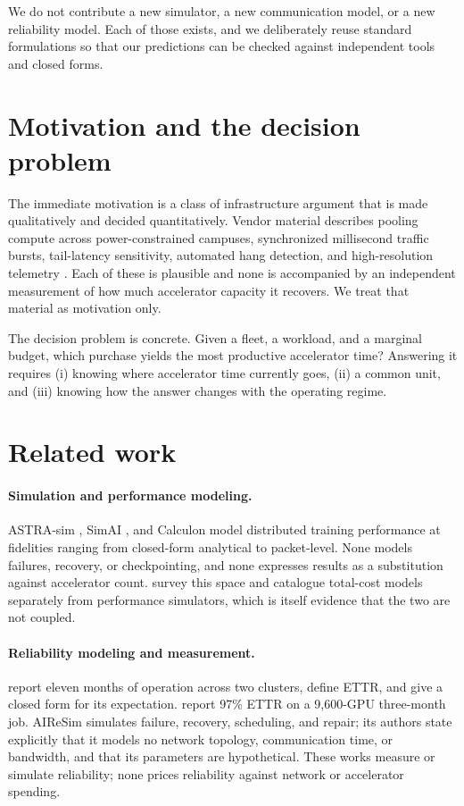 \documentclass[11pt]{article}
\begin{document}
We do not contribute a new simulator, a new communication model, or a new
reliability model. Each of those exists, and we deliberately reuse standard
formulations so that our predictions can be checked against independent tools
and closed forms.

\section{Motivation and the decision problem}

The immediate motivation is a class of infrastructure argument that is made
qualitatively and decided quantitatively. Vendor material describes pooling
compute across power-constrained campuses, synchronized millisecond traffic
bursts, tail-latency sensitivity, automated hang detection, and high-resolution
telemetry \citep{googlecloud2025network}. Each of these is plausible and none is
accompanied by an independent measurement of how much accelerator capacity it
recovers. We treat that material as motivation only.

The decision problem is concrete. Given a fleet, a workload, and a marginal
budget, which purchase yields the most productive accelerator time? Answering it
requires (i) knowing where accelerator time currently goes, (ii) a common unit,
and (iii) knowing how the answer changes with the operating regime.

\section{Related work}

\paragraph{Simulation and performance modeling.} ASTRA-sim
\citep{won2026astrasim3}, SimAI \citep{simai2025}, and Calculon
\citep{isaev2023calculon} model distributed training performance at fidelities
ranging from closed-form analytical to packet-level. None models failures,
recovery, or checkpointing, and none expresses results as a substitution against
accelerator count. \citet{svedas2025survey} survey this space and catalogue
total-cost models separately from performance simulators, which is itself
evidence that the two are not coupled.

\paragraph{Reliability modeling and measurement.}
\citet{kokolis2025reliability} report eleven months of operation across two
clusters, define ETTR, and give a closed form for its expectation.
\citet{bytedance2025byterobust} report 97\% ETTR on a 9{,}600-GPU three-month
job. AIReSim \citep{pattabiraman2026airesim} simulates failure, recovery,
scheduling, and repair; its authors state explicitly that it models no network
topology, communication time, or bandwidth, and that its parameters are
hypothetical. These works measure or simulate reliability; none prices
reliability against network or accelerator spending.
\end{document}
